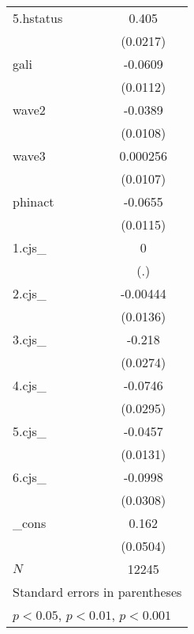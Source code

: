 \begin{table}[htbp]
\begin{tabular}{l*{1}{c}}
5.hstatus   &       0.405\sym{***}\\
            &    (0.0217)         \\
gali        &     -0.0609\sym{***}\\
            &    (0.0112)         \\
wave2       &     -0.0389\sym{***}\\
            &    (0.0108)         \\
wave3       &    0.000256         \\
            &    (0.0107)         \\
phinact     &     -0.0655\sym{***}\\
            &    (0.0115)         \\
1.cjs\_      &           0         \\
            &         (.)         \\
2.cjs\_      &    -0.00444         \\
            &    (0.0136)         \\
3.cjs\_      &      -0.218\sym{***}\\
            &    (0.0274)         \\
4.cjs\_      &     -0.0746\sym{*}  \\
            &    (0.0295)         \\
5.cjs\_      &     -0.0457\sym{***}\\
            &    (0.0131)         \\
6.cjs\_      &     -0.0998\sym{**} \\
            &    (0.0308)         \\
\_cons      &       0.162\sym{**} \\
            &    (0.0504)         \\
\hline
\(N\)       &       12245         \\
\hline\hline
\multicolumn{2}{l}{\footnotesize Standard errors in parentheses}\\
\multicolumn{2}{l}{\footnotesize \sym{*} \(p<0.05\), \sym{**} \(p<0.01\), \sym{***} \(p<0.001\)}\\
\end{tabular}
\end{table}

